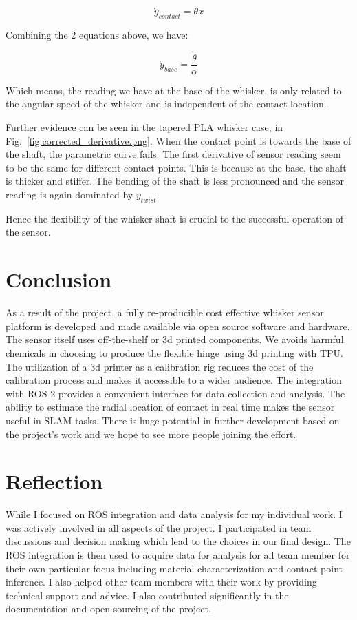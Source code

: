 \documentclass{report}
\begin{document}
    \[\dot{y}_{contact} = \dot{\theta}x\]

Combining the 2 equations above, we have:

    \[\dot{y}_{base} = \frac{\dot{\theta}}{\alpha} \]

Which means, the reading we have at the base of the whisker, is only related to the angular speed of the whisker and is independent of the contact location.

Further evidence can be seen in the tapered PLA whisker case, in Fig.~\ref*{fig:corrected_derivative.png}. When the contact point is towards the base of the shaft, the parametric curve fails. The first derivative of sensor reading seem to be the same for different contact points. This is because at the base, the shaft is thicker and stiffer. The bending of the shaft is less pronounced and the sensor reading is again dominated by \({y}_{twist}\).

Hence the flexibility of the whisker shaft is crucial to the successful operation of the sensor.


\section{Conclusion}

As a result of the project, a fully re-producible cost effective whisker sensor platform is developed and made available via open source software and hardware. The sensor itself uses off-the-shelf or 3d printed components. We avoids harmful chemicals in choosing to produce the flexible hinge using 3d printing with TPU. The utilization of a 3d printer as a calibration rig reduces the cost of the calibration process and makes it accessible to a wider audience. The integration with ROS 2 provides a convenient interface for data collection and analysis. The ability to estimate the radial location of contact in real time makes the sensor useful in SLAM tasks. There is huge potential in further development based on the project's work and we hope to see more people joining the effort.

\section{Reflection}

While I focused on ROS integration and data analysis for my individual work. I was actively involved in all aspects of the project. I participated in team discussions and decision making which lead to the choices in our final design. The ROS integration is then used to acquire data for analysis for all team member for their own particular focus including material characterization and contact point inference. I also helped other team members with their work by providing technical support and advice. I also contributed significantly in the documentation and open sourcing of the project.
\end{document}
